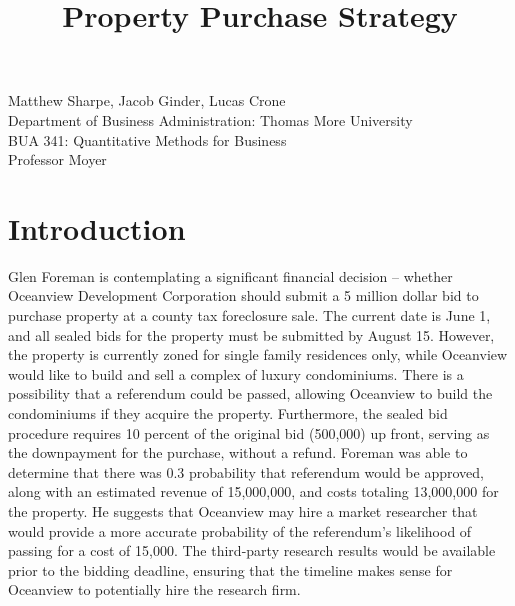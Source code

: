 \documentclass{article}
\title{\textbf{Property Purchase Strategy}}
\begin{document}
\maketitle


\begin{center}
    \large Matthew Sharpe, Jacob Ginder, Lucas Crone \\   Department of  Business Administration: Thomas More University \\  
    \large BUA 341: Quantitative Methods for Business \\  
    \large Professor Moyer \\  
\end{center}


\section{Introduction}


\indent Glen Foreman is contemplating a significant financial decision – whether Oceanview Development Corporation should submit a 5 million dollar bid to purchase property at a county tax foreclosure sale. The current date is June 1, and all sealed bids for the property must be submitted by August 15. However, the property is currently zoned for single family residences only, while Oceanview would like to build and sell a complex of luxury condominiums. There is a possibility that a referendum could be passed, allowing Oceanview to build the condominiums if they acquire the property. Furthermore, the sealed bid procedure requires 10 percent of the original bid (500,000) up front, serving as the downpayment for the purchase, without a refund. Foreman was able to determine that there was 0.3 probability that referendum would be approved, along with an estimated revenue of 15,000,000, and costs totaling 13,000,000 for the property. He suggests that Oceanview may hire a market researcher that would provide a more accurate probability of the referendum’s likelihood of passing for a cost of 15,000. The third-party research results would be available prior to the bidding deadline, ensuring that the timeline makes sense for Oceanview to potentially hire the research firm.\\ \\ \\ \\ \\ \\ \\

  
\end{document}
